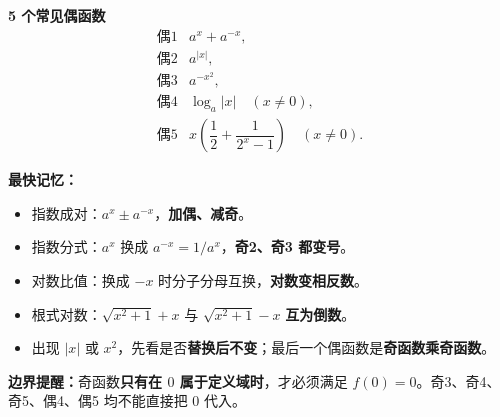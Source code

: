 \begin{statementbox}
\textbf{\textcolor{CStatement}{5 个常见偶函数}}
\[
\begin{array}{rl}
\text{偶1}&a^x+a^{-x},\\[3pt]
\text{偶2}&a^{|x|},\\[3pt]
\text{偶3}&a^{-x^2},\\[3pt]
\text{偶4}&\log_a|x|\quad(x\ne0),\\[3pt]
\text{偶5}&x\left(\dfrac12+\dfrac1{2^x-1}\right)\quad(x\ne0).
\end{array}
\]

\textbf{最快记忆：}
\begin{itemize}[leftmargin=*,itemsep=.25em]
 \item 指数成对：$a^x\pm a^{-x}$，\textbf{加偶、减奇}。
 \item 指数分式：$a^x$ 换成 $a^{-x}=1/a^x$，\textbf{奇2、奇3 都变号}。
 \item 对数比值：换成 $-x$ 时分子分母互换，\textbf{对数变相反数}。
 \item 根式对数：$\sqrt{x^2+1}+x$ 与 $\sqrt{x^2+1}-x$ \textbf{互为倒数}。
 \item 出现 $|x|$ 或 $x^2$，先看是否\textbf{替换后不变}；最后一个偶函数是\textbf{奇函数乘奇函数}。
\end{itemize}

\textbf{边界提醒：}奇函数\textbf{只有在 $0$ 属于定义域时}，才必须满足 $f(0)=0$。奇3、奇4、奇5、偶4、偶5 均不能直接把 $0$ 代入。
\end{statementbox}

